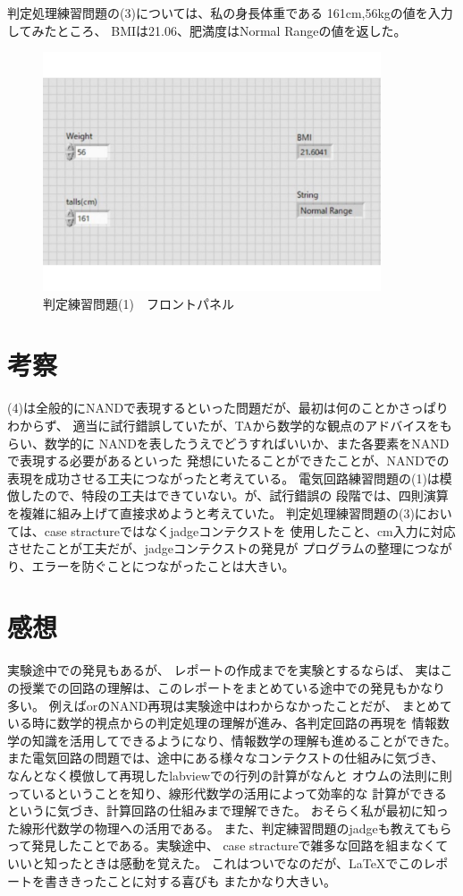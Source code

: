 \documentclass[a4paper,titlepage,11pt]{ltjsarticle}
\begin{document}
判定処理練習問題の(3)については、私の身長体重である
161cm,56kgの値を入力してみたところ、
BMIは21.06、肥満度はNormal Rangeの値を返した。

\begin{figure}[H]
  \begin{center}
    \includegraphics[width=100mm]{jadge3f.pdf}
    \caption{判定練習問題(1)　フロントパネル}
  \end{center}
\end{figure}

  \section{考察}
  (4)は全般的にNANDで表現するといった問題だが、最初は何のことかさっぱりわからず、
  適当に試行錯誤していたが、TAから数学的な観点のアドバイスをもらい、数学的に
  NANDを表したうえでどうすればいいか、また各要素をNANDで表現する必要があるといった
  発想にいたることができたことが、NANDでの表現を成功させる工夫につながったと考えている。
  電気回路練習問題の(1)は模倣したので、特段の工夫はできていない。が、試行錯誤の
  段階では、四則演算を複雑に組み上げて直接求めようと考えていた。
  判定処理練習問題の(3)においては、case stractureではなくjadgeコンテクストを
  使用したこと、cm入力に対応させたことが工夫だが、jadgeコンテクストの発見が
  プログラムの整理につながり、エラーを防ぐことにつながったことは大きい。

  \section{感想}
  実験途中での発見もあるが、
  レポートの作成までを実験とするならば、
  実はこの授業での回路の理解は、このレポートをまとめている途中での発見もかなり
  多い。
  例えばorのNAND再現は実験途中はわからなかったことだが、
  まとめている時に数学的視点からの判定処理の理解が進み、各判定回路の再現を
  情報数学の知識を活用してできるようになり、情報数学の理解も進めることができた。
  また電気回路の問題では、途中にある様々なコンテクストの仕組みに気づき、
  なんとなく模倣して再現したlabviewでの行列の計算がなんと
  オウムの法則に則っているということを知り、線形代数学の活用によって効率的な
  計算ができるというに気づき、計算回路の仕組みまで理解できた。
  おそらく私が最初に知った線形代数学の物理への活用である。
  また、判定練習問題のjadgeも教えてもらって発見したことである。実験途中、
  case stractureで雑多な回路を組まなくていいと知ったときは感動を覚えた。
  これはついでなのだが、\LaTeX でこのレポートを書ききったことに対する喜びも
  またかなり大きい。
\end{document}
